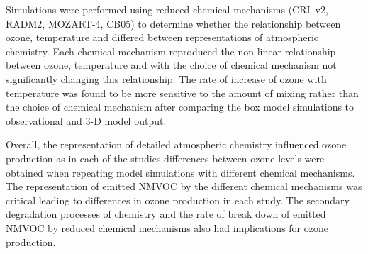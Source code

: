 Simulations were performed using reduced chemical mechanisms (CRI~v2, RADM2, MOZART-4, CB05) to determine whether the relationship between ozone, temperature and  differed between representations of atmospheric chemistry.
Each chemical mechanism reproduced the non-linear relationship between ozone, temperature and  with the choice of chemical mechanism not significantly changing this relationship.
The rate of increase of ozone with temperature was found to be more sensitive to the amount of mixing rather than the choice of chemical mechanism after comparing the box model simulations to observational and 3-D model output.

Overall, the representation of detailed atmospheric chemistry influenced ozone production as in each of the studies differences between ozone levels were obtained when repeating model simulations with different chemical mechanisms.
The representation of emitted NMVOC by the different chemical mechanisms was critical leading to differences in ozone production in each study.
The secondary degradation processes of  chemistry and the rate of break down of emitted NMVOC by reduced chemical mechanisms also had implications for ozone production.
